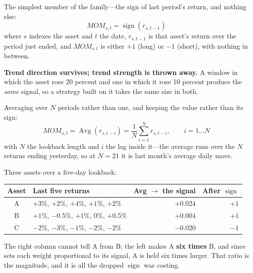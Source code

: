 \begin{definition}\label{def:binary-momentum}
The simplest member of the family---the sign of last period's return, and nothing else:
\[
  \mathit{MOM}_{s,t} = \operatorname{sign}\left( r_{s,t-1} \right)
\]
where $s$ indexes the asset and $t$ the date, $r_{s,t-1}$ is that asset's return over the period
just ended, and $\mathit{MOM}_{s,t}$ is either $+1$ (long) or $-1$ (short), with nothing in between.
\end{definition}

\textbf{Trend direction survives; trend strength is thrown away.} A window in which the asset rose
20 percent and one in which it rose 10 percent produce the \emph{same} signal, so a strategy built
on it takes the same size in both.


\begin{definition}[Momentum]\label{def:momentum-avg}
Averaging over $N$ periods rather than one, and keeping the value rather than its sign:
\[
  \mathit{MOM}_{s,t} = \operatorname{Avg}\left( r_{s,t-i} \right)
    = \frac{1}{N} \sum_{i=1}^{N} r_{s,t-i}, \qquad i = 1 \ldots N
\]
with $N$ the lookback length and $i$ the lag inside it---the average runs over the $N$ returns
ending yesterday, so at $N = 21$ it is last month's average daily move.
\end{definition}

\begin{example}\label{ex:three-assets}
Three assets over a five-day lookback:

\begin{center}
\begin{tabular}{|c|l|r|r|}
\hline
\textbf{Asset} & \textbf{Last five returns} & \textbf{Avg $\rightarrow$ the signal} & \textbf{After $\operatorname{sign}$} \\ \hline
A & $+3\%$, $+2\%$, $+4\%$, $+1\%$, $+2\%$      & $\mathbf{+0.024}$ & $+1$ \\ \hline
B & $+1\%$, $-0.5\%$, $+1\%$, $0\%$, $+0.5\%$   & $\mathbf{+0.004}$ & $+1$ \\ \hline
C & $-2\%$, $-3\%$, $-1\%$, $-2\%$, $-2\%$      & $\mathbf{-0.020}$ & $-1$ \\ \hline
\end{tabular}
\end{center}

The right column cannot tell A from B; the left makes A \textbf{six times} B, and since
 sets each weight proportional to its signal, A is held six times
larger. That ratio is the magnitude, and it is all the dropped $\operatorname{sign}$ was costing.
\end{example}

